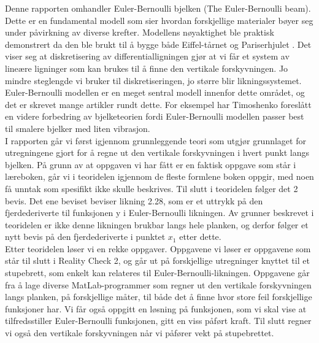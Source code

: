 

Denne rapporten omhandler Euler-Bernoulli bjelken (The Euler-Bernoulli beam). Dette er en fundamental modell som sier hvordan forskjellige materialer bøyer seg under påvirkning av diverse krefter. Modellens nøyaktighet ble praktisk demonstrert da den ble brukt til å bygge både Eiffel-tårnet og Pariserhjulet \cite{NdogmoEB}.  Det viser seg at diskretisering av differentialligningen gjør at vi får et system av lineære ligninger som kan brukes til å finne den vertikale forskyvningen. Jo mindre steglengde vi bruker til diskretiseringen, jo større blir likningssystemet. Euler-Bernoulli modellen er en meget sentral modell innenfor dette området, og det er skrevet mange artikler rundt dette. For eksempel har Timoshenko foreslått en videre forbedring av bjelketeorien\cite{Timoshenko} fordi Euler-Bernoulli modellen passer best til smalere bjelker med liten vibrasjon.\\

I rapporten går vi først igjennom grunnleggende teori som utgjør grunnlaget for utregningene gjort for å regne ut den vertikale forskyvningen i hvert punkt langs bjelken. På grunn av at oppgaven vi har fått er en faktisk oppgave som står i læreboken, går vi i teoridelen igjennom de fleste formlene boken oppgir, med noen få unntak som spesifikt ikke skulle beskrives. Til slutt i teoridelen følger det 2 bevis. Det ene beviset beviser likning 2.28, som er et uttrykk på den fjerdederiverte til funksjonen y i Euler-Bernoulli likningen. Av grunner beskrevet i teoridelen er ikke denne likningen brukbar langs hele planken, og derfor følger et nytt bevis på den fjerdederiverte i punktet $x_1$ etter dette. \\

Etter teoridelen løser vi en rekke oppgaver. Oppgavene vi løser er oppgavene som står til slutt i Reality Check 2, og går ut på forskjellige utregninger knyttet til et stupebrett, som enkelt kan relateres til Euler-Bernoulli-likningen. Oppgavene går fra å lage diverse MatLab-programmer som regner ut den vertikale forskyvningen langs planken, på forskjellige måter, til både det å finne hvor store feil forskjellige funksjoner har. Vi får også oppgitt en løsning på funksjonen, som vi skal vise at tilfredsstiller Euler-Bernoulli funksjonen, gitt en viss påført kraft. Til slutt regner vi også den vertikale forskyvningen når vi påfører vekt på stupebrettet. \\ 